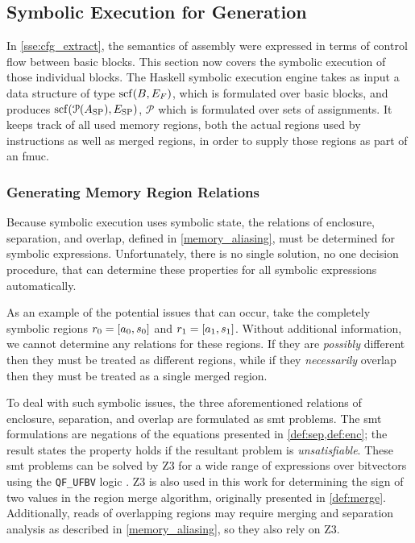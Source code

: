 \subsection{Symbolic Execution for Generation}\label{sse:syntax_symb}
In \cref{sse:cfg_extract}, the semantics of assembly were expressed%
in terms of control flow between basic blocks.
This section now covers the symbolic execution of those individual blocks.
The Haskell symbolic execution engine
takes as input a data structure of type $\operatorname{scf}(B,E_F)$,
which is formulated over basic blocks,
and produces $\operatorname{scf}(\operatorname{\mathcal P}(A_\mathrm{SP}),E_\mathrm{SP})$,%
$\mathscr{P}$
which is formulated over sets of assignments.
It keeps track of all used memory regions,
both the actual regions used by instructions as well as merged regions,
in order to supply those regions as part of an \ac{fmuc}.

\subsubsection{Generating Memory Region Relations}
Because symbolic execution uses symbolic state,
the relations of enclosure, separation, and overlap,
defined in \cref{memory_aliasing}, must be determined for symbolic expressions.
Unfortunately, there is no single solution, no one decision procedure,
that can determine these properties for all symbolic expressions automatically.

As an example of the potential issues that can occur,
take the completely symbolic regions $r_0=[a_0,s_0]$
and $r_1=[a_1,s_1]$.
Without additional information, we cannot determine any relations for these regions.
If they are \emph{possibly} different then they must be treated as different regions,
while if they \emph{necessarily} overlap
then they must be treated as a single merged region.

To deal with such symbolic issues,
the three aforementioned relations of enclosure, separation, and overlap
are formulated as \ac{smt} problems.
The \ac{smt} formulations are negations
of the equations presented in \cref{def:sep,def:enc};
the result states the property holds if the resultant problem is \emph{unsatisfiable}.
These \ac{smt} problems can be solved by Z3 \autocite{de2008z3}
for a wide range of expressions over bitvectors
using the \lstinline|QF_UFBV| logic \autocite{smtlib:bitvector-logic,smtlib:bitvector-theory}.
Z3 is also used in this work for determining the sign of two values
in the region merge algorithm, originally presented in \cref{def:merge}.
Additionally, reads of overlapping regions may require merging
and separation analysis as described in \cref{memory_aliasing},
so they also rely on Z3.

